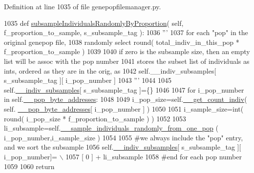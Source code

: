 Definition at line 1035 of file genepopfilemanager.\+py.


\begin{DoxyCode}
1035     \textcolor{keyword}{def }\hyperlink{classnegui_1_1genepopfilemanager_1_1GenepopFileManager_a5c85ac4838fd6919be1c408bcd39f54e}{subsampleIndividualsRandomlyByProportion}( self, 
      f\_proportion\_to\_sample, s\_subsample\_tag ):
1036         \textcolor{stringliteral}{'''}
1037 \textcolor{stringliteral}{        for each "pop" in the original genepop file,}
1038 \textcolor{stringliteral}{        randomly select round( total\_indiv\_in\_this\_pop * f\_proportion\_to\_sample )}
1039 \textcolor{stringliteral}{        }
1040 \textcolor{stringliteral}{        if zero is the subsample size, then an empty list will be assoc with the pop number}
1041 \textcolor{stringliteral}{        stores the subset list of individuals as ints, ordered as they are in the orig, as      }
1042 \textcolor{stringliteral}{        self.\_\_indiv\_subsamples[ s\_subsample\_tag ][ i\_pop\_number ]}
1043 \textcolor{stringliteral}{        '''}
1044 
1045         self.\hyperlink{classnegui_1_1genepopfilemanager_1_1GenepopFileManager_a1e8379bcee4902ca9314ff53fcb71644}{\_\_indiv\_subsamples}[ s\_subsample\_tag ]=\{\}
1046 
1047         \textcolor{keywordflow}{for} i\_pop\_number \textcolor{keywordflow}{in} self.\hyperlink{classnegui_1_1genepopfilemanager_1_1GenepopFileManager_ae24c2bdd19136a345bdb42fd49c5d91f}{\_\_pop\_byte\_addresses}:
1048 
1049             i\_pop\_size=self.\hyperlink{classnegui_1_1genepopfilemanager_1_1GenepopFileManager_ac7cc98fe56efee82b4ffd4dc816a4704}{\_\_get\_count\_indiv}( self.
      \hyperlink{classnegui_1_1genepopfilemanager_1_1GenepopFileManager_ae24c2bdd19136a345bdb42fd49c5d91f}{\_\_pop\_byte\_addresses}[ i\_pop\_number ] )
1050 
1051             i\_sample\_size=int( round( i\_pop\_size * f\_proportion\_to\_sample ) )
1052 
1053             li\_subsample=self.\hyperlink{classnegui_1_1genepopfilemanager_1_1GenepopFileManager_a9818467c9cb40f8e1de0c6cc7f52e263}{\_\_sample\_individuals\_randomly\_from\_one\_pop}
      ( i\_pop\_number,i\_sample\_size )
1054 
1055             \textcolor{comment}{#we always include the "pop" entry, and we sort the subsample}
1056             self.\hyperlink{classnegui_1_1genepopfilemanager_1_1GenepopFileManager_a1e8379bcee4902ca9314ff53fcb71644}{\_\_indiv\_subsamples}[ s\_subsample\_tag ][ i\_pop\_number]= \(\backslash\)
1057                      [ 0 ] +  li\_subsample
1058         \textcolor{comment}{#end for each pop number}
1059 
1060         \textcolor{keywordflow}{return}
\end{DoxyCode}
